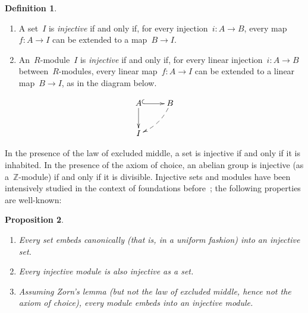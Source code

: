 \documentclass[oneside]{amsart}
\theoremstyle{definition}
\newtheorem{defn}{Definition}[section]
\theoremstyle{plain}
\newtheorem{prop}[defn]{Proposition}
\theoremstyle{remark}
\newcommand{\ZZ}{\mathbb{Z}}
\renewcommand{\_}{\mathpunct{.}\,}
\begin{document}
\begin{defn}\begin{enumerate}
\item A set~$I$ is \emph{injective} if and only if, for every injection~$i
: A \to B$, every map~$f : A \to I$ can be extended to a map~$B \to I$.
\item An~$R$-module~$I$ is \emph{injective} if and only if, for every linear
injection~$i : A \to B$ between~$R$-modules, every linear map~$f : A \to I$ can
be extended to a linear map~$B \to I$, as in the diagram below.
\end{enumerate}
\[ \xymatrix{
  A \ar@{^{(}->}[r]\ar[d] & B \ar@{-->}@/^/[ld] \\
  I
} \]
\end{defn}

In the presence of the law of excluded middle, a set is injective if and only
if it is inhabited. In the presence of the axiom of choice, an abelian group is
injective (as a~$\ZZ$-module) if and only if it is divisible. Injective sets
and modules have been intensively studied in the context of foundations
before~\cite{blass:inj-proj-axc,harting:locally-injective,kenney:injective-choice,aczel-berg-granstroem-schuster:injective};
the following properties are well-known:

\begin{prop}\label{prop:basics-injective}
\begin{enumerate}
\item Every set embeds canonically (that is, in a uniform fashion) into an injective set.
\item Every injective module is also injective as a set.
\item Assuming Zorn's lemma (but not the law of excluded middle, hence not the
axiom of choice), every module embeds into an
injective module.
\end{enumerate}\end{prop}
\end{document}
